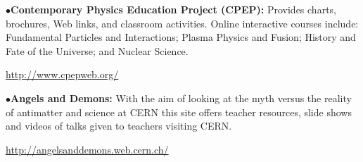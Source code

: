 \medskip
\medskip


\item{$\bullet$}{\bf Contemporary Physics Education Project (CPEP):}
Provides charts, brochures, Web links, and classroom activities. Online interactive courses include: Fundamental Particles and Interactions; Plasma Physics and Fusion; History and Fate of the Universe; and Nuclear Science.
	\item{}\qquad\url{http://www.cpepweb.org/}




%






\medskip
\medskip
{}

\medskip

\item{$\bullet$}{\bf Angels and Demons:}
With the aim of looking at the myth versus the reality of antimatter and science at CERN this site offers teacher resources, slide shows and videos of talks given to teachers visiting CERN.
	\item{}\qquad\url{http://angelsanddemons.web.cern.ch/}

